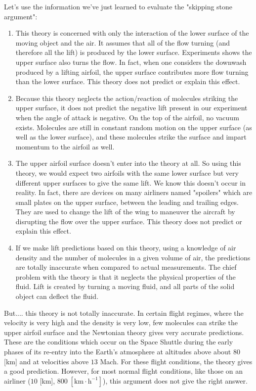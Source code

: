 	
	Let's use the information we've just learned to evaluate the "skipping stone argument":
	\begin{enumerate}
		\item This theory is concerned with only the interaction of the lower surface of the moving object and the air. It assumes that all of the flow turning (and therefore all the lift) is produced by the lower surface. Experiments shows the upper surface also turns the flow. In fact, when one considers the downwash produced by a lifting airfoil, the upper surface contributes more flow turning than the lower surface. This theory does not predict or explain this effect.

		\item Because this theory neglects the action/reaction of molecules striking the upper surface, it does not predict the negative lift present in our experiment when the angle of attack is negative. On the top of the airfoil, no vacuum exists. Molecules are still in constant random motion on the upper surface (as well as the lower surface), and these molecules strike the surface and impart momentum to the airfoil as well.
		
		\item The upper airfoil surface doesn't enter into the theory at all. So using this theory, we would expect two airfoils with the same lower surface but very different upper surfaces to give the same lift. We know this doesn't occur in reality. In fact, there are devices on many airliners named "spoilers" which are small plates on the upper surface, between the leading and trailing edges. They are used to change the lift of the wing to maneuver the aircraft by disrupting the flow over the upper surface. This theory does not predict or explain this effect.
		
		\item If we make lift predictions based on this theory, using a knowledge of air density and the number of molecules in a given volume of air, the predictions are totally inaccurate when compared to actual measurements. The chief problem with the theory is that it neglects the physical properties of the fluid. Lift is created by turning a moving fluid, and all parts of the solid object can deflect the fluid.
	\end{enumerate}
	But.... this theory is not totally inaccurate. In certain flight regimes, where the velocity is very high and the density is very low, few molecules can strike the upper airfoil surface and the Newtonian theory gives very accurate predictions. These are the conditions which occur on the Space Shuttle during the early phases of its re-entry into the Earth's atmosphere at altitudes above about $80$ [km] and at velocities above $13$ Mach. For these flight conditions, the theory gives a good prediction. However, for most normal flight conditions, like those on an airliner ($10$ [km], $800\;[\text{km}\cdot \text{h}^{-1}]$), this argument does not give the right answer.
	
